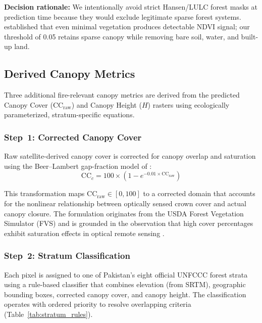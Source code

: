 \documentclass[12pt,a4paper,twoside]{article}
\newcommand{\CCraw}{\text{CC}_{\text{raw}}}
\newcommand{\CCc}{\text{CC}_{c}}
\begin{document}
\textbf{Decision rationale:} We intentionally avoid strict Hansen/LULC forest
masks at prediction time because they would exclude legitimate sparse forest
systems.  \citet{Tucker1979} established that even minimal vegetation produces
detectable NDVI signal; our threshold of 0.05 retains sparse canopy while removing
bare soil, water, and built-up land.

\subsection{Derived Canopy Metrics}\label{sec:derived_metrics}

Three additional fire-relevant canopy metrics are derived from the predicted Canopy
Cover ($\CCraw$) and Canopy Height ($H$) rasters using ecologically parameterized,
stratum-specific equations.

\subsubsection{Step~1: Corrected Canopy Cover}\label{sec:cc_correction}

Raw satellite-derived canopy cover is corrected for canopy overlap and saturation
using the Beer--Lambert gap-fraction model of \citet{Crookston1999}:
\begin{equation}
  \CCc = 100 \times \left(1 - e^{-0.01 \times \CCraw}\right)
  \label{eq:cc_correction}
\end{equation}

This transformation maps $\CCraw \in [0,100]$ to a corrected domain that accounts
for the nonlinear relationship between optically sensed crown cover and actual canopy
closure.  The formulation originates from the USDA Forest Vegetation Simulator (FVS)
and is grounded in the observation that high cover percentages exhibit saturation
effects in optical remote sensing \citep{Crookston1999}.

\subsubsection{Step~2: Stratum Classification}\label{sec:stratum_class}

Each pixel is assigned to one of Pakistan's eight official UNFCCC forest strata
using a rule-based classifier that combines elevation (from SRTM), geographic
bounding boxes, corrected canopy cover, and canopy height.  The classification
operates with ordered priority to resolve overlapping criteria
(Table~\ref{tab:stratum_rules}).
\end{document}
